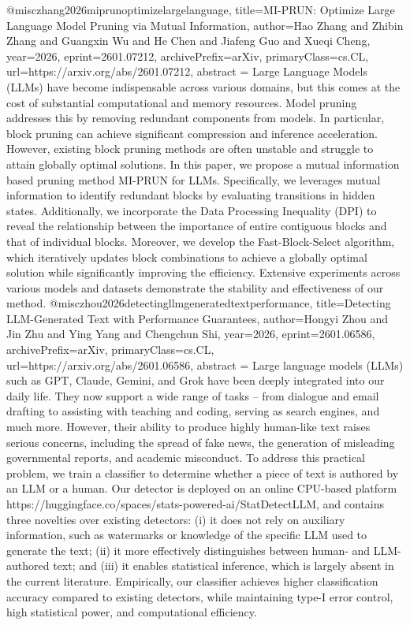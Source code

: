 {}@misc{zhang2026miprunoptimizelargelanguage,
      title={MI-PRUN: Optimize Large Language Model Pruning via Mutual Information}, 
      author={Hao Zhang and Zhibin Zhang and Guangxin Wu and He Chen and Jiafeng Guo and Xueqi Cheng},
      year={2026},
      eprint={2601.07212},
      archivePrefix={arXiv},
      primaryClass={cs.CL},
      url={https://arxiv.org/abs/2601.07212},
      abstract = {Large Language Models (LLMs) have become indispensable across various domains, but this comes at the cost of substantial computational and memory resources. Model pruning addresses this by removing redundant components from models. In particular, block pruning can achieve significant compression and inference acceleration. However, existing block pruning methods are often unstable and struggle to attain globally optimal solutions. In this paper, we propose a mutual information based pruning method MI-PRUN for LLMs. Specifically, we leverages mutual information to identify redundant blocks by evaluating transitions in hidden states. Additionally, we incorporate the Data Processing Inequality (DPI) to reveal the relationship between the importance of entire contiguous blocks and that of individual blocks. Moreover, we develop the Fast-Block-Select algorithm, which iteratively updates block combinations to achieve a globally optimal solution while significantly improving the efficiency. Extensive experiments across various models and datasets demonstrate the stability and effectiveness of our method.}
}@misc{zhou2026detectingllmgeneratedtextperformance,
      title={Detecting LLM-Generated Text with Performance Guarantees}, 
      author={Hongyi Zhou and Jin Zhu and Ying Yang and Chengchun Shi},
      year={2026},
      eprint={2601.06586},
      archivePrefix={arXiv},
      primaryClass={cs.CL},
      url={https://arxiv.org/abs/2601.06586},
      abstract = {Large language models (LLMs) such as GPT, Claude, Gemini, and Grok have been deeply integrated into our daily life. They now support a wide range of tasks -- from dialogue and email drafting to assisting with teaching and coding, serving as search engines, and much more. However, their ability to produce highly human-like text raises serious concerns, including the spread of fake news, the generation of misleading governmental reports, and academic misconduct. To address this practical problem, we train a classifier to determine whether a piece of text is authored by an LLM or a human. Our detector is deployed on an online CPU-based platform https://huggingface.co/spaces/stats-powered-ai/StatDetectLLM, and contains three novelties over existing detectors: (i) it does not rely on auxiliary information, such as watermarks or knowledge of the specific LLM used to generate the text; (ii) it more effectively distinguishes between human- and LLM-authored text; and (iii) it enables statistical inference, which is largely absent in the current literature. Empirically, our classifier achieves higher classification accuracy compared to existing detectors, while maintaining type-I error control, high statistical power, and computational efficiency.}
}
